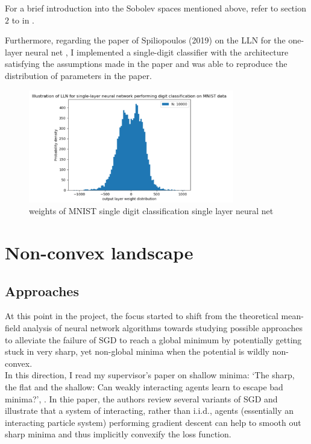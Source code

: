 \documentclass{article}
\begin{document}
\begin{remark}
	For a brief introduction into the Sobolev spaces mentioned above, refer to section $ 2$ to in \cite{sirignano2019meanfieldanalysisclt}.
\end{remark}


Furthermore, regarding the paper of Spiliopoulos (2019) on the LLN for the one-layer neural net \cite{sirignano2019meanfieldanalysislln}, I implemented a single-digit classifier with the architecture satisfying the assumptions made in the paper and was able to reproduce the distribution of parameters in the paper.

\begin{figure}[H]
    \centering
    \includegraphics[width=0.8\textwidth]{images/Spiliopoulos2019-LLN-singleNN-mnist.png}
    \caption{weights of MNIST single digit classification single layer neural net}
    \label{fig: MNIST spiliopoulos}
\end{figure}

\section{Non-convex landscape}

\subsection{Approaches}

At this point in the project, the focus started to shift from the theoretical mean-field analysis of neural network algorithms towards studying possible approaches to alleviate the failure of SGD to reach a global minimum by potentially getting stuck in very sharp, yet non-global minima when the potential is wildly non-convex.\\ 

In this direction, I read my supervisor's paper on shallow minima: ‘The sharp, the flat and the shallow: Can weakly interacting agents learn to escape bad minima?’, \cite{kantas2019sharpflatshallowweakl}. In thie paper, the authors review several variants of SGD and illustrate that a system of interacting, rather than i.i.d., agents (essentially an interacting particle system) performing gradient descent can help to smooth out sharp minima and thus implicitly convexify
the loss function.\\ 
\end{document}
